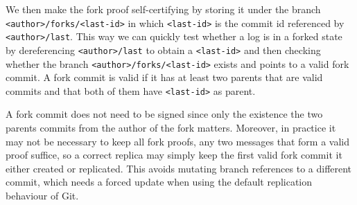 \documentclass[9pt, oneside]{article}   	%
\begin{document}
We then make the fork proof self-certifying by storing it under the branch \texttt{<author>/forks/<last-id>} in which \texttt{<last-id>} is the commit id  referenced by \texttt{<author>/last}.  This way we can quickly test whether a log is in a forked state by dereferencing \texttt{<author>/last} to obtain a \texttt{<last-id>} and then checking whether the branch \texttt{<author>/forks/<last-id>} exists and points to a valid fork commit. A fork commit is valid if it has at least two parents that are valid commits and that both of them have \texttt{<last-id>} as parent.

\begin{table}[ht]
\caption{Encoding of fork proofs as Git commits.}
\label{tb:git-fork-commit}
\end{table}


A fork commit does not need to be signed since only the existence the two parents commits from the author of the fork matters. Moreover, in practice it may not be necessary to keep all fork proofs, any two messages that form a valid proof suffice, so a correct replica may simply keep the first valid fork commit it either created or replicated. This avoids mutating branch references to a different commit, which needs a forced update when using the default replication behaviour of Git. 
\end{document}
